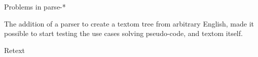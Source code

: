 Problems in parse-*

The addition of a parser to create a \gls{textom} tree from arbitrary
  English, made it possible to start testing the use cases solving
  pseudo-code, and \gls{textom} itself.



Retext


% 

\endgroup

